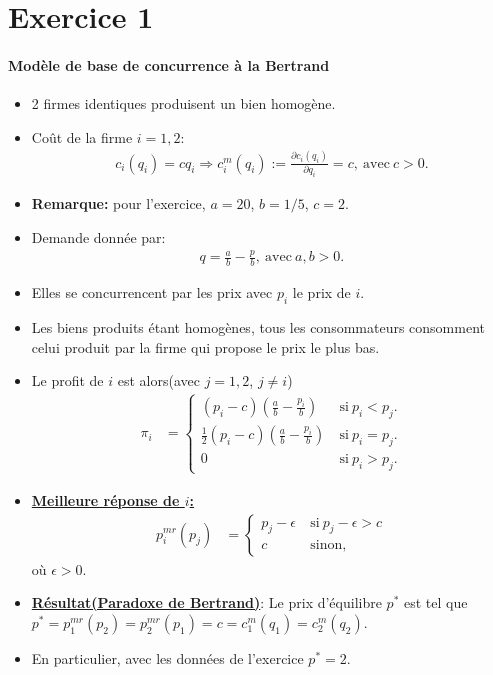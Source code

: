 \section{Exercice 1}
\frame{\sectionpage}
\begin{frame}[allowframebreaks]{\insertsection}
\framesubtitle{Modèle de base de concurrence à la Bertrand}
\begin{itemize}
    \item 2 firmes identiques produisent un bien homogène.  
    \item Coût de la firme $i=1, 2$:
    \begin{align*}
        c_i(q_i)=cq_i \Rightarrow c^m_i(q_i):= \frac{\partial c_i(q_i)}{\partial q_i} = c, \ \text{avec} \ c > 0.
    \end{align*}
    \item \underline{}\textbf{Remarque:} pour l'exercice, $a=20$, $b=1/5$,   $c=2$.
    \item Demande donnée par: 
    \begin{align*}
        q = \frac{a}{b} -\frac{p}{b}, \ \text{avec} \ a, b > 0.
    \end{align*}
    \item Elles se concurrencent par les prix avec $p_i$ le prix de $i$.
    \item Les biens produits étant homogènes, tous les consommateurs consomment celui produit par la firme 
    qui propose le prix le plus bas. 
    \item Le profit de $i$ est alors(avec $j=1, 2$, $j\neq i$)
    \begin{align*}
        \pi_i &=\left\{
            \begin{array}{ll}
                (p_i-c)\left(  \frac{a}{b} -\frac{p_i}{b} \right) & \ \text{si} \ p_i<p_j.\\
                \frac{1}{2}(p_i-c)\left(  \frac{a}{b} -\frac{p_i}{b} \right) & \ \text{si} \ p_i = p_j.\\
                 0& \ \text{si} \ p_i > p_j.
            \end{array}
        \right.
    \end{align*}
    \item \textbf{\underline{Meilleure réponse de $i$:}}
    \begin{align*}
         p^{mr}_i(p_j) &=
         \left\{
         \begin{array}{ll}
            p_j - \epsilon & \ \text{si} \ p_j  -\epsilon> c\\
            c & \ \text{sinon},
         \end{array}
         \right.
    \end{align*}
    où $\epsilon > 0$.
    \item \textbf{\underline{Résultat(Paradoxe de Bertrand)}}: Le prix d'équilibre $p^*$ est tel que $p^* = p^{mr}_1(p_2) = p^{mr}_2(p_1) =c=c^m_1(q_1) = c^m_2(q_2)$.
    \item En particulier, avec les données de l'exercice $p^* = 2$.
\end{itemize}
\end{frame}

